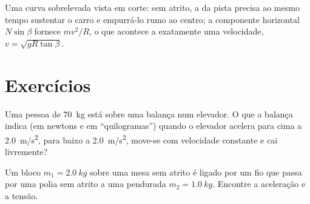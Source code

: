 \begin{omfigure}

{\small Uma curva sobrelevada vista em corte: sem atrito, a  da pista precisa ao mesmo tempo sustentar o carro e empurrá-lo rumo
ao centro; a componente horizontal $N\sin\beta$ fornece $mv^2/R$,
o que acontece a exatamente uma velocidade, $v = \sqrt{gR\tan\beta}$.}
\end{omfigure}

\section{Exercícios}

\begin{exercise}[$\star$]\label{exo:b1:newton-dynamics:1}
Uma pessoa de  \qty{70}{kg} está sobre uma balança num elevador. O que
a balança indica (em newtons e em ``quilogramas'') quando o elevador
acelera para cima a \qty{2.0}{m/s^2}, para baixo a \qty{2.0}{m/s^2},
move-se com velocidade constante e cai livremente?
\end{exercise}

\begin{exercise}[$\star$]\label{exo:b1:newton-dynamics:2}
Um bloco $m_1 = \qty{2.0}{kg}$ sobre uma mesa sem atrito é ligado por um
fio que passa por uma polia sem atrito a uma  pendurada $m_2 = \qty{1.0}{kg}$.
Encontre a aceleração e a tensão.
\end{exercise}

